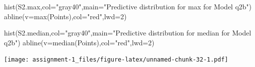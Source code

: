\documentclass[
]{article}
\newenvironment{Shaded}{\begin{snugshade}}{\end{snugshade}}
\newcommand{\AttributeTok}[1]{\textcolor[rgb]{0.77,0.63,0.00}{#1}}
\newcommand{\DecValTok}[1]{\textcolor[rgb]{0.00,0.00,0.81}{#1}}
\newcommand{\FunctionTok}[1]{\textcolor[rgb]{0.00,0.00,0.00}{#1}}
\newcommand{\NormalTok}[1]{#1}
\newcommand{\StringTok}[1]{\textcolor[rgb]{0.31,0.60,0.02}{#1}}
\begin{document}
\begin{Shaded}
\begin{Highlighting}[]
\FunctionTok{hist}\NormalTok{(S2.max,}\AttributeTok{col=}\StringTok{"gray40"}\NormalTok{,}\AttributeTok{main=}\StringTok{"Predictive distribution for max for Model q2b"}\NormalTok{)}
\FunctionTok{abline}\NormalTok{(}\AttributeTok{v=}\FunctionTok{max}\NormalTok{(Points),}\AttributeTok{col=}\StringTok{"red"}\NormalTok{,}\AttributeTok{lwd=}\DecValTok{2}\NormalTok{)}

\FunctionTok{hist}\NormalTok{(S2.median,}\AttributeTok{col=}\StringTok{"gray40"}\NormalTok{,}\AttributeTok{main=}\StringTok{"Predictive distribution for median for Model q2b"}\NormalTok{)}
\FunctionTok{abline}\NormalTok{(}\AttributeTok{v=}\FunctionTok{median}\NormalTok{(Points),}\AttributeTok{col=}\StringTok{"red"}\NormalTok{,}\AttributeTok{lwd=}\DecValTok{2}\NormalTok{)}
\end{Highlighting}
\end{Shaded}

\texttt{[image: assignment-1\_files/figure-latex/unnamed-chunk-32-1.pdf]}
\end{document}
